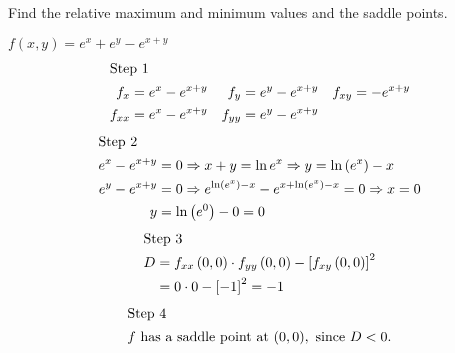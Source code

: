 \documentclass[12pt]{article}
\newenvironment{problem}[2][]{
    \begin{trivlist}
        \item[
            {\bfseries #1}
            {\bfseries #2.}
        ]
}{\end{trivlist}}
\begin{document}
\bigskip

\noindent Find the relative maximum and minimum values and the saddle points.

\begin{problem}{23}
    $f(x,y) = e^x + e^y - e^{x + y}$
    \begin{align*}
        \shortintertext{Step 1}
        f_x &= e^x - e^{x+y} & f_y &= e^y - e^{x+y} & f_{xy} &= -e^{x+y} \\
        f_{xx} &= e^x - e^{x+y} & f_{yy} &= e^y - e^{x+y}
    \end{align*}
    \begin{align}
        \shortintertext{Step 2}
        e^x - e^{x+y} &= 0 \Rightarrow x + y = \ln e^x \Rightarrow y = \ln \left(e^x\right) - x \\
        e^y - e^{x+y} &= 0 \Rightarrow e^{\ln\left(e^x\right) - x} - e^{x + \ln\left(e^x\right) - x} = 0 \Rightarrow x = 0 \\
        y &= \ln\left(e^0\right) - 0 = 0
    \end{align}
    \begin{align}
        \shortintertext{Step 3}
        D &= f_{xx} \left(0,0\right) \cdot f_{yy} \left(0,0\right) - \left[f_{xy} \left(0,0\right)\right]^2 \\
        &= 0 \cdot 0 - \left[-1\right]^2 = -1
    \end{align}
    \begin{align}
        \shortintertext{Step 4}
        f \text{ has a saddle point at } (0,0), \text{ since } D < 0.
    \end{align}
\end{problem}
\end{document}
